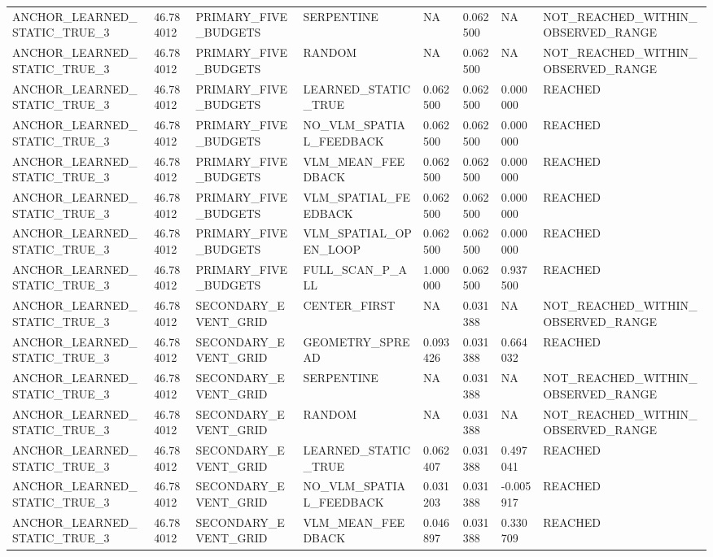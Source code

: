 \begin{tabular}{llllllll}
ANCHOR\_LEARNED\_STATIC\_TRUE\_3 & 46.784012 & PRIMARY\_FIVE\_BUDGETS & SERPENTINE & NA & 0.062500 & NA & NOT\_REACHED\_WITHIN\_OBSERVED\_RANGE \\
ANCHOR\_LEARNED\_STATIC\_TRUE\_3 & 46.784012 & PRIMARY\_FIVE\_BUDGETS & RANDOM & NA & 0.062500 & NA & NOT\_REACHED\_WITHIN\_OBSERVED\_RANGE \\
ANCHOR\_LEARNED\_STATIC\_TRUE\_3 & 46.784012 & PRIMARY\_FIVE\_BUDGETS & LEARNED\_STATIC\_TRUE & 0.062500 & 0.062500 & 0.000000 & REACHED \\
ANCHOR\_LEARNED\_STATIC\_TRUE\_3 & 46.784012 & PRIMARY\_FIVE\_BUDGETS & NO\_VLM\_SPATIAL\_FEEDBACK & 0.062500 & 0.062500 & 0.000000 & REACHED \\
ANCHOR\_LEARNED\_STATIC\_TRUE\_3 & 46.784012 & PRIMARY\_FIVE\_BUDGETS & VLM\_MEAN\_FEEDBACK & 0.062500 & 0.062500 & 0.000000 & REACHED \\
ANCHOR\_LEARNED\_STATIC\_TRUE\_3 & 46.784012 & PRIMARY\_FIVE\_BUDGETS & VLM\_SPATIAL\_FEEDBACK & 0.062500 & 0.062500 & 0.000000 & REACHED \\
ANCHOR\_LEARNED\_STATIC\_TRUE\_3 & 46.784012 & PRIMARY\_FIVE\_BUDGETS & VLM\_SPATIAL\_OPEN\_LOOP & 0.062500 & 0.062500 & 0.000000 & REACHED \\
ANCHOR\_LEARNED\_STATIC\_TRUE\_3 & 46.784012 & PRIMARY\_FIVE\_BUDGETS & FULL\_SCAN\_P\_ALL & 1.000000 & 0.062500 & 0.937500 & REACHED \\
ANCHOR\_LEARNED\_STATIC\_TRUE\_3 & 46.784012 & SECONDARY\_EVENT\_GRID & CENTER\_FIRST & NA & 0.031388 & NA & NOT\_REACHED\_WITHIN\_OBSERVED\_RANGE \\
ANCHOR\_LEARNED\_STATIC\_TRUE\_3 & 46.784012 & SECONDARY\_EVENT\_GRID & GEOMETRY\_SPREAD & 0.093426 & 0.031388 & 0.664032 & REACHED \\
ANCHOR\_LEARNED\_STATIC\_TRUE\_3 & 46.784012 & SECONDARY\_EVENT\_GRID & SERPENTINE & NA & 0.031388 & NA & NOT\_REACHED\_WITHIN\_OBSERVED\_RANGE \\
ANCHOR\_LEARNED\_STATIC\_TRUE\_3 & 46.784012 & SECONDARY\_EVENT\_GRID & RANDOM & NA & 0.031388 & NA & NOT\_REACHED\_WITHIN\_OBSERVED\_RANGE \\
ANCHOR\_LEARNED\_STATIC\_TRUE\_3 & 46.784012 & SECONDARY\_EVENT\_GRID & LEARNED\_STATIC\_TRUE & 0.062407 & 0.031388 & 0.497041 & REACHED \\
ANCHOR\_LEARNED\_STATIC\_TRUE\_3 & 46.784012 & SECONDARY\_EVENT\_GRID & NO\_VLM\_SPATIAL\_FEEDBACK & 0.031203 & 0.031388 & -0.005917 & REACHED \\
ANCHOR\_LEARNED\_STATIC\_TRUE\_3 & 46.784012 & SECONDARY\_EVENT\_GRID & VLM\_MEAN\_FEEDBACK & 0.046897 & 0.031388 & 0.330709 & REACHED \\

\end{tabular}
